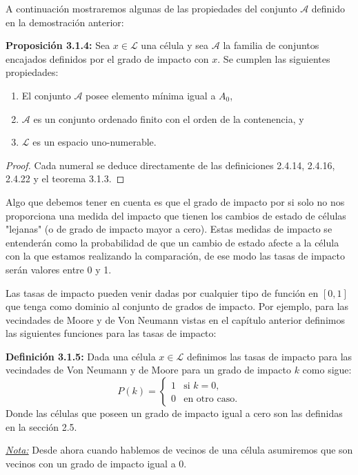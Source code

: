 A continuación mostraremos algunas de las propiedades del conjunto $\mathcal{A}$ definido en la demostración anterior:

\textbf{Proposición 3.1.4:} Sea $x\in\mathcal{L}$ una célula y sea $\mathcal{A}$ la familia de conjuntos encajados definidos por el grado de impacto con $x$. Se cumplen las siguientes propiedades:

\begin{enumerate}
    \item El conjunto $\mathcal{A}$ posee elemento mínima igual a $A_0$,
    \item $\mathcal{A}$ es un conjunto ordenado finito con el orden de la contenencia, y
    \item $\mathcal{L}$ es un espacio uno-numerable.
\end{enumerate}

\begin{proof}
Cada numeral se deduce directamente de las definiciones 2.4.14, 2.4.16, 2.4.22 y el teorema 3.1.3.
\end{proof}

Algo que debemos tener en cuenta es que el grado de impacto por si solo no nos proporciona una medida del impacto que tienen los cambios de estado de células "lejanas" (o de grado de impacto mayor a cero). Estas medidas de impacto se entenderán como la probabilidad de que un cambio de estado afecte a la célula con la que estamos realizando la comparación, de ese modo las tasas de impacto serán valores entre 0 y 1.

Las tasas de impacto pueden venir dadas por cualquier tipo de función en $[0,1]$ que tenga como dominio al conjunto de grados de impacto. Por ejemplo, para las vecindades de Moore y de Von Neumann vistas en el capítulo anterior definimos las siguientes funciones para las tasas de impacto:

\textbf{Definición 3.1.5:} Dada una célula $x\in\mathcal{L}$ definimos las tasas de impacto para las vecindades de Von Neumann y de Moore para un grado de impacto $k$ como sigue:
\begin{equation*}
    P(k) = \left\{\begin{array}{ll}
        1 & \text{si }k=0, \\
        0 & \text{en otro caso.}
    \end{array}\right.
\end{equation*}
Donde las células que poseen un grado de impacto igual a cero son las definidas en la sección 2.5.

\underline{\textit{Nota:}} Desde ahora cuando hablemos de vecinos de una célula asumiremos que son vecinos con un grado de impacto igual a 0.

